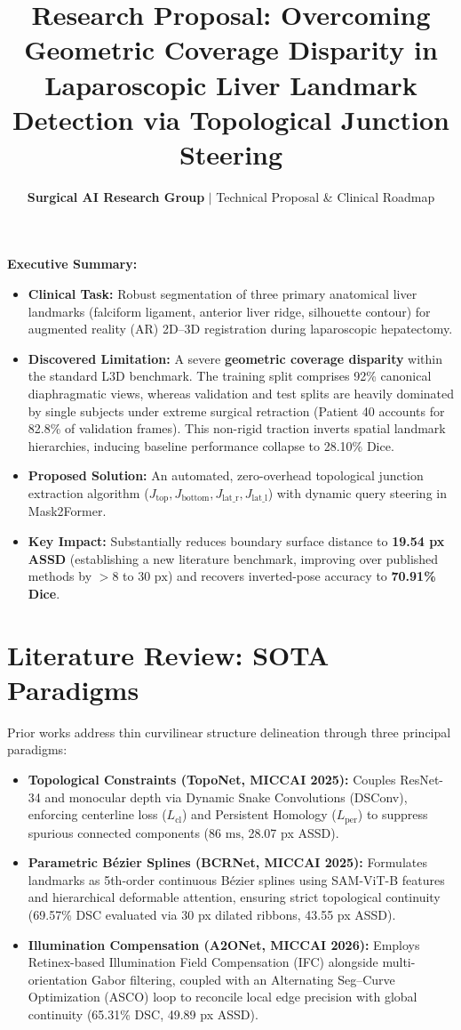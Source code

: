\documentclass[10pt]{article}
\title{\vspace{-15pt}\Large\textbf{Research Proposal: Overcoming Geometric Coverage Disparity in}\\\Large\textbf{Laparoscopic Liver Landmark Detection via Topological Junction Steering}\vspace{-8pt}}
\author{\normalsize\textbf{Surgical AI Research Group} \quad $\vert$ \quad Technical Proposal \& Clinical Roadmap\vspace{-10pt}}
\date{}
\begin{document}
\maketitle

\vspace{-6pt}
\noindent\textbf{Executive Summary:}
\begin{itemize}
    \item \textbf{Clinical Task:} Robust segmentation of three primary anatomical liver landmarks (falciform ligament, anterior liver ridge, silhouette contour) for augmented reality (AR) 2D--3D registration during laparoscopic hepatectomy.
    \item \textbf{Discovered Limitation:} A severe \textbf{geometric coverage disparity} within the standard L3D benchmark. The training split comprises 92\% canonical diaphragmatic views, whereas validation and test splits are heavily dominated by single subjects under extreme surgical retraction (Patient 40 accounts for 82.8\% of validation frames). This non-rigid traction inverts spatial landmark hierarchies, inducing baseline performance collapse to 28.10\% Dice.
    \item \textbf{Proposed Solution:} An automated, zero-overhead topological junction extraction algorithm ($J_{\text{top}}, J_{\text{bottom}}, J_{\text{lat\_r}}, J_{\text{lat\_l}}$) with dynamic query steering in Mask2Former.
    \item \textbf{Key Impact:} Substantially reduces boundary surface distance to \textbf{19.54 px ASSD} (establishing a new literature benchmark, improving over published methods by $>8$ to $30\text{ px}$) and recovers inverted-pose accuracy to \textbf{70.91\% Dice}.
\end{itemize}

\section{Literature Review: SOTA Paradigms}
Prior works address thin curvilinear structure delineation through three principal paradigms:
\begin{itemize}
    \item \textbf{Topological Constraints (TopoNet, MICCAI 2025):} Couples ResNet-34 and monocular depth via Dynamic Snake Convolutions (DSConv), enforcing centerline loss ($L_{\text{cl}}$) and Persistent Homology ($L_{\text{per}}$) to suppress spurious connected components ($86\text{ ms}$, 28.07 px ASSD).
    \item \textbf{Parametric B\'ezier Splines (BCRNet, MICCAI 2025):} Formulates landmarks as 5th-order continuous B\'ezier splines using SAM-ViT-B features and hierarchical deformable attention, ensuring strict topological continuity (69.57\% DSC evaluated via 30 px dilated ribbons, 43.55 px ASSD).
    \item \textbf{Illumination Compensation (A2ONet, MICCAI 2026):} Employs Retinex-based Illumination Field Compensation (IFC) alongside multi-orientation Gabor filtering, coupled with an Alternating Seg--Curve Optimization (ASCO) loop to reconcile local edge precision with global continuity (65.31\% DSC, 49.89 px ASSD).
\end{itemize}
\end{document}

